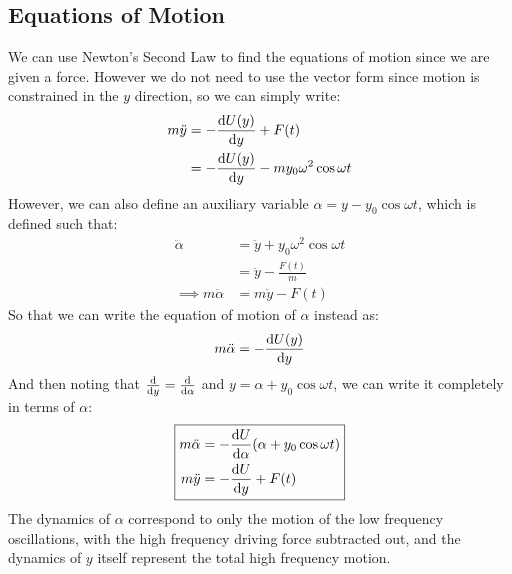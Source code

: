 \subsection{Equations of Motion}
We can use Newton's Second Law to find the equations of motion since we are given a force. However we do not need to use the vector form since motion is constrained in the $y$ direction, so we can simply write:
\begin{align*}
  m\ddot{y}&=-\dv{U(y)}{y}+F(t)\\
  &=-\dv{U(y)}{y}-my_0\omega^2\cos\omega t
\end{align*}
However, we can also define an auxiliary variable $\alpha=y-y_0\cos\omega t$, which is defined such that:
\begin{align*}
  \ddot{\alpha}&=\ddot{y}+y_0\omega^2\cos\omega t\\
  &=\ddot{y}-\frac{F(t)}{m}\\
  \implies m\ddot{\alpha}&=m\ddot{y}-F(t)
\end{align*}
So that we can write the equation of motion of $\alpha$ instead as:
\begin{align*}
  m\ddot{\alpha}=-\dv{U(y)}{y}
\end{align*}
And then noting that $\dv{y}=\dv{\alpha}$ and $y=\alpha+y_0\cos\omega t$, we can write it completely in terms of $\alpha$:
\begin{align}
  \boxed{
    \begin{aligned}
      m\ddot{\alpha}&=-\dv{U}{\alpha}\qty(\alpha+y_0\cos\omega t)\\
      m\ddot{y}&=-\dv{U}{y}(y)+F(t)
    \end{aligned}
  }
\end{align}
The dynamics of $\alpha$ correspond to only the motion of the low frequency oscillations, with the high frequency driving force subtracted out, and the dynamics of $y$ itself represent the total high frequency motion.

